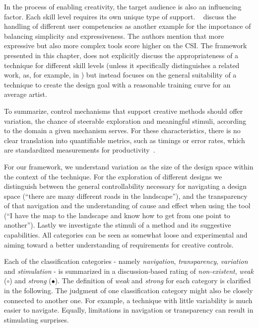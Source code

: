 In the process of enabling creativity, the target audience is also an influencing factor. Each skill level requires its own unique type of support. \citeauthor*{cherry_2014_qcs}~\cite{cherry_2014_qcs} discuss the handling of different user competencies as another example for the importance of balancing simplicity and expressiveness. The authors mention that more expressive but also more complex tools score higher on the CSI. The framework presented in this chapter, does not explicitly discuss the appropriateness of a technique for different skill levels (unless it specifically distinguishes a related work, as, for example, in \cite{benedetti_2014_pba}) but instead focuses on the general suitability of a technique to create the design goal with a reasonable training curve for an average artist.


To summarize, control mechanisms that support creative methods should offer variation, the chance of steerable exploration and meaningful stimuli, according to the domain a given mechanism serves. For these characteristics, there is no clear translation into quantifiable metrics, such as timings or error rates, which are standardized measurements for productivity~\cite{cherry_2014_qcs,shneiderman_2007_cst}.

For our framework, we understand variation as the size of the design space within the context of the technique. For the exploration of different designs we distinguish between the general controllability necessary for navigating a design space (``there are many different roads in the landscape''), and the transparency of that navigation and the understanding of cause and effect when using the tool (``I have the map to the landscape and know how to get from one point to another''). Lastly we investigate the stimuli of a method and its suggestive capabilities. All categories can be seen as somewhat loose and experimental and aiming toward a better understanding of requirements for creative controls.

Each of the classification categories - namely \textit{navigation}, \textit{transparency}, \textit{variation} and \textit{stimulation} - is summarized in a discussion-based rating of \textit{non-existent}, \textit{weak} ($\circ$) and \textit{strong} ($\bullet$). The definition of \textit{weak} and \textit{strong} for each category is clarified in the following. The judgment of one classification category might also be closely connected to another one. For example, a technique with little variability is much easier to navigate. Equally, limitations in navigation or transparency can result in stimulating surprises.

